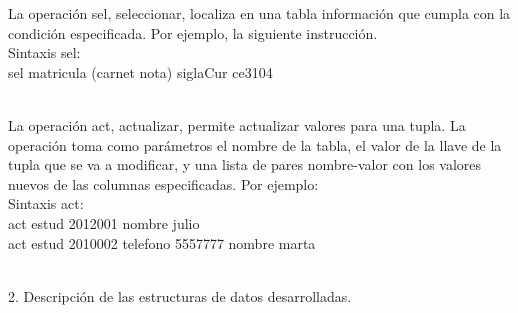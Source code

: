 \documentclass[12pt,a4paper]{report}
\begin{document}
\begin{flushleft}
La operación sel, seleccionar, localiza en una tabla información que cumpla con la condición especificada. Por ejemplo, la siguiente instrucción.\\
Sintaxis sel:\\
sel matricula (carnet nota) siglaCur ce3104\\\

La operación act, actualizar, permite actualizar valores para una tupla. La operación toma como parámetros el nombre de la tabla, el valor de la 
llave de la tupla que se va a modificar, y una lista de pares nombre-valor con los valores nuevos de las columnas especificadas. Por ejemplo:\\
Sintaxis act:\\
act estud 2012001 nombre julio \\
act estud 2010002 telefono 5557777 nombre marta\\\


\end{flushleft}

\begin{flushleft}

2. Descripción de las estructuras de datos desarrolladas.

\end{flushleft}
\end{document}
